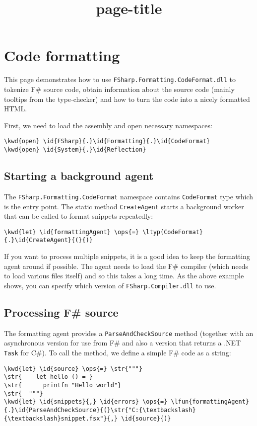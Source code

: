 \documentclass{article}
\title{{page-title}}
\date{}
\newcommand{\id}[1]{\textcolor{black}{#1}}
\newcommand{\kwd}[1]{\textcolor{navy}{#1}}
\newcommand{\ops}[1]{\textcolor{purple}{#1}}
\newcommand{\str}[1]{\textcolor{olive}{#1}}
\begin{document}
\maketitle

\section*{Code formatting}



This page demonstrates how to use \texttt{FSharp.Formatting.CodeFormat.dll} to tokenize
F\# source code, obtain information about the source code (mainly tooltips
from the type-checker) and how to turn the code into a nicely formatted HTML.


First, we need to load the assembly and open necessary namespaces:
\begin{Verbatim}[commandchars=\\\{\}]
\kwd{open} \id{FSharp}{.}\id{Formatting}{.}\id{CodeFormat}
\kwd{open} \id{System}{.}\id{Reflection}
\end{Verbatim}

\subsection*{Starting a background agent}



The \texttt{FSharp.Formatting.CodeFormat} namespace contains \texttt{CodeFormat} type which is the
entry point. The static method \texttt{CreateAgent} starts a background worker that
can be called to format snippets repeatedly:
\begin{Verbatim}[commandchars=\\\{\}]
\kwd{let} \id{formattingAgent} \ops{=} \ltyp{CodeFormat}{.}\id{CreateAgent}{(}{)}
\end{Verbatim}



If you want to process multiple snippets, it is a good idea to keep the
formatting agent around if possible. The agent needs to load the F\# compiler
(which needs to load various files itself) and so this takes a long time. As the above
example shows, you can specify which version of \texttt{FSharp.Compiler.dll} to use.
\subsection*{Processing F\# source}



The formatting agent provides a \texttt{ParseAndCheckSource} method (together with an asynchronous
version for use from F\# and also a version that returns a .NET \texttt{Task} for C\#).
To call the method, we define a simple F\# code as a string:
\begin{Verbatim}[commandchars=\\\{\}]
\kwd{let} \id{source} \ops{=} \str{"""}
\str{    let hello () = }
\str{      printfn "Hello world"}
\str{  """}
\kwd{let} \id{snippets}{,} \id{errors} \ops{=} \lfun{formattingAgent}{.}\id{ParseAndCheckSource}{(}\str{"C:{\textbackslash}{\textbackslash}snippet.fsx"}{,} \id{source}{)}
\end{Verbatim}
\end{document}
